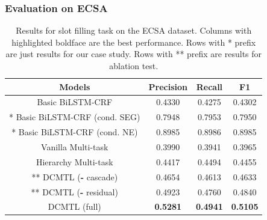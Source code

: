 \subsubsection{Evaluation on ECSA}
\begin{table}[th]
	\centering
	\small
	\caption{Results for slot filling task on the ECSA dataset.
		Columns with highlighted boldface are the best performance.
		Rows with * prefix are just results for our case study.
		Rows with ** prefix are results for ablation test.}
	\begin{tabular}{c|ccc}
		\toprule
		Models & Precision & Recall & F1 \\
		\midrule
		Basic BiLSTM-CRF & 0.4330 & 0.4275 & 0.4302 \\
		* Basic BiLSTM-CRF (cond. SEG) & 0.7948 & 0.7953 & 0.7950 \\
		* Basic BiLSTM-CRF (cond. NE) & 0.8985 & 0.8986 & 0.8985 \\
		\midrule
		Vanilla Multi-task & 0.3990 & 0.3941 & 0.3965 \\
		Hierarchy Multi-task & 0.4417 & 0.4494 & 0.4455 \\
		\midrule
		** DCMTL (\textbf{-} cascade) & 0.4654  & 0.4613 & 0.4633  \\
		** DCMTL (\textbf{-} residual) & 0.4923 & 0.4760 & 0.4840  \\
		DCMTL (full) & \textbf{0.5281} & \textbf{0.4941} & \textbf{0.5105} \\
		\bottomrule
	\end{tabular}
	\label{tab:eval_ECSGA}
\end{table}

